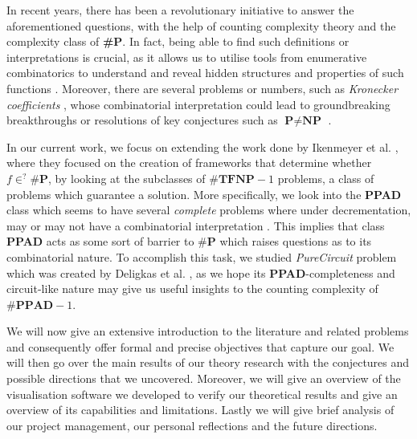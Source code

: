 In recent years, there has been a revolutionary initiative to answer the aforementioned questions,
with the help of counting complexity theory and the complexity class of \textbf{\#P}.
In fact, being able to find such definitions or interpretations is crucial,
as it allows us to utilise tools from enumerative combinatorics to understand
and reveal hidden structures and properties of such functions \cite{pak_WhatCombinatorialInterpretation_2022,ikenmeyer_WhatWhatNot_2022}.
Moreover, there are several problems or numbers, such as \textit{Kronecker coefficients} \cite{Makar_1949},
whose combinatorial interpretation could lead to groundbreaking breakthroughs
or resolutions of key conjectures such as $\textbf{P} \neq \textbf{NP}$ \cite{ikenmeyer_WhatWhatNot_2022, ikenmeyer_VanishingKroneckerCoefficients_2017}.


In our current work, we focus on extending the work done by
Ikenmeyer et al. \cite{ikenmeyer_WhatWhatNot_2022}, where they focused on the creation of frameworks
that determine whether $f \in^? \textbf{\#P}$, by looking
at the subclasses of $\textbf{\#TFNP}-1$ problems, a class of problems which guarantee a solution.
More specifically, we look into the \textbf{PPAD} class which
seems to have several \textit{complete} problems where under decrementation,
may or may not have a combinatorial interpretation \cite{ikenmeyer_WhatWhatNot_2022}.
This implies that class \textbf{PPAD} acts as some sort of barrier
to $\textbf{\#P}$ which raises questions as to its combinatorial nature.
To accomplish this task,
we studied \textit{PureCircuit} problem
which was created by Deligkas et al. \cite{deligkas_PureCircuitTightInapproximability_2024},
as we hope its \textbf{PPAD}-completeness and circuit-like nature may give us
useful insights to the counting complexity of $\textbf{\#PPAD}-1$.


We will now give an extensive introduction to the literature and related problems
and consequently offer formal and precise objectives that capture our goal.
We will then go over the main results of our theory research with the conjectures and possible
directions that we uncovered. Moreover, we will give an overview of the visualisation software
we developed to verify our theoretical results and give an overview of its capabilities and limitations.
Lastly we will give brief analysis of our project management, our personal reflections
and the future directions.


